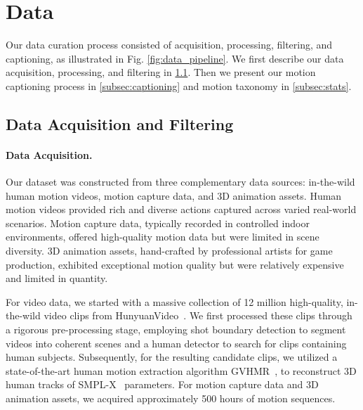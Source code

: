 \section{Data}
\label{sec:data}

Our data curation process consisted of acquisition, processing, filtering, and captioning, as illustrated in Fig. \ref{fig:data_pipeline}. We first describe our data acquisition, processing, and filtering in \cref{subsec:data_source}. Then we present our motion captioning process in \cref{subsec:captioning} and motion taxonomy in \cref{subsec:stats}.





\subsection{Data Acquisition and Filtering}
\label{subsec:data_source}


\paragraph{Data Acquisition.}



Our dataset was constructed from three complementary data sources: in-the-wild human motion videos, motion capture data, and 3D animation assets.
Human motion videos provided rich and diverse actions captured across varied real-world scenarios.
Motion capture data, typically recorded in controlled indoor environments, offered high-quality motion data but were limited in scene diversity.
3D animation assets, hand-crafted by professional artists for game production, exhibited exceptional motion quality but were relatively expensive and limited in quantity.


For video data, we started with a massive collection of 12 million high-quality, in-the-wild video clips from HunyuanVideo~\citep{hunyuanvideo2025}.
We first processed these clips through a rigorous pre-processing stage, employing shot boundary detection to segment videos into coherent scenes and a human detector to search for clips containing human subjects.
Subsequently, for the resulting candidate clips, we utilized a state-of-the-art human motion extraction algorithm GVHMR~\citep{shen2024gvhmr}, to reconstruct 3D human tracks of SMPL-X~\citep{smplx} parameters.
For motion capture data and 3D animation assets, we acquired approximately 500 hours of motion sequences.












